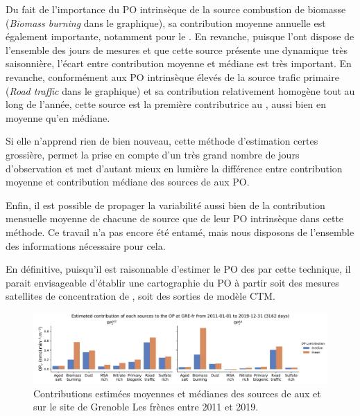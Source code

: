 Du fait de l'importance du PO intrinsèque de la source combustion de biomasse
(\textit{Biomass burning} dans le graphique), sa contribution moyenne annuelle est
également importante, notamment pour le \POAAv.  En revanche, puisque l'ont dispose de
l'ensemble des jours de mesures et que cette source présente une dynamique très
saisonnière, l'écart entre contribution moyenne et médiane est très important.
En revanche, conformément aux PO intrinsèque élevés de la source trafic primaire
(\textit{Road traffic} dans le graphique) et sa contribution relativement homogène tout au
long de l'année, cette source est la première contributrice au \PODTTv, aussi bien en
moyenne qu'en médiane.

Si elle n'apprend rien de bien nouveau, cette méthode d'estimation certes grossière,
permet la prise en compte d'un très grand nombre de jours d'observation et met d'autant
mieux en lumière la différence entre contribution moyenne et contribution médiane des
sources de \PMdix{} aux PO.

Enfin, il est possible de propager la variabilité aussi bien de la contribution mensuelle
moyenne de chacune de source que de leur PO intrinsèque dans cette méthode. Ce travail n'a
pas encore été entamé, mais nous disposons de l'ensemble des informations nécessaire pour
cela.

En définitive, puisqu'il est raisonnable d'estimer le PO des \PMdix{} par cette technique,
il parait envisageable d'établir une cartographie du PO à partir soit des mesures satellites
de concentration de \PMdix, soit des sorties de modèle CTM.

\begin{figure}[ht]
    \centering
    \includegraphics[width=1.0\linewidth]{figures/chapter05/OPGRE-fr_source_estimated.pdf}
    \caption{Contributions estimées moyennes et médianes des sources de \PMdix{} aux
        \PODTTv{} et \POAAv{} sur le site de Grenoble Les frènes entre 2011 et 2019.}%
    \label{fig:OPGRE-fr_source_estimated}
\end{figure}

